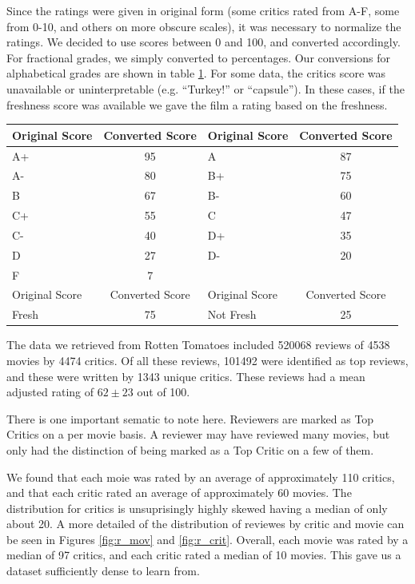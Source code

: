 \documentclass[12pt]{article}
\begin{document}
Since the ratings were given in original form (some critics rated from A-F, 
some from 0-10, and others on more obscure scales), it was necessary to 
normalize the ratings. We decided to use scores between 0 and 100, and converted
accordingly. For fractional grades, we simply converted to percentages. Our 
conversions for alphabetical grades are shown in table \ref{tab:conv}. For some 
data, the critics score was unavailable or uninterpretable (e.g. ``Turkey!'' or 
``capsule''). In these cases, if the freshness score was available we gave the 
film a rating based on the freshness.

\begin{table}[H]
\centering
\begin{tabular}{ | l | c | l | c |}

\hline
Original Score & Converted Score & Original Score & Converted Score \\
\hline
A+ & 95 & A  & 87 \\
A- & 80 & B+ & 75 \\
B  & 67 & B- & 60 \\
C+ & 55 & C  & 47 \\
C- & 40 & D+ & 35 \\
D  & 27 & D- & 20 \\
F  & 7 &    &     \\
\hline
Original Score & Converted Score & Original Score & Converted Score \\
\hline
Fresh & 75 & Not Fresh & 25 \\
\hline
\end{tabular}
\label{tab:conv}
\end{table}

The data we retrieved from Rotten Tomatoes included 520068 reviews of 4538 
movies by 4474 critics. Of all these reviews, 101492 were identified as top 
reviews, and these were written by 1343 unique critics. These reviews had a 
mean adjusted rating of $ 62 \pm 23$ out of 100.

There is one important sematic to note here. Reviewers are marked as Top 
Critics on a per movie basis. A reviewer may have reviewed many movies, but 
only had the distinction of being marked as a Top Critic on a few of them. 

We found that each moie was rated by an average of approximately 110 critics, 
and that each critic rated an average of approximately 60 movies. 
The distribution for critics is unsuprisingly highly skewed having a median 
of only about 20. A more detailed of the distribution of reviewes by critic
and movie can be seen in Figures \ref{fig:r_mov} and \ref{fig:r_crit}.
Overall, each movie was rated by a median of 97 critics, and each critic rated 
a median of 10 movies. This gave us a dataset sufficiently dense to learn from.
\end{document}

